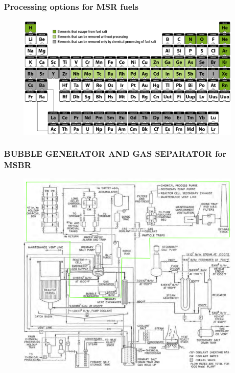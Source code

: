 \documentclass[9pt]{beamer}
\begin{document}

\begin{frame}
  \frametitle{Processing options for \gls{MSR} fuels}
               \begin{figure}[t]
                \vspace*{-0.1in}
			\hspace{-0.3in}
                \includegraphics[height=0.6\textwidth]{./images/periodic_map.png}
               \end{figure}
              
\end{frame}

\begin{frame}
  \frametitle{BUBBLE GENERATOR AND GAS SEPARATOR for \gls{MSBR}}
               \begin{figure}[t]
                \vspace*{-0.1in}
                \includegraphics[height=0.7\textwidth]{./images/gas_separation.png}
               \end{figure}
              
\end{frame}
\end{document}
